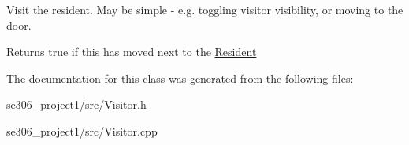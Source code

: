 Visit the resident. May be simple -\/ e.\-g. toggling visitor visibility, or moving to the door. 

\begin{DoxyReturn}{Returns}
true if this has moved next to the \hyperlink{classResident}{Resident} 
\end{DoxyReturn}


The documentation for this class was generated from the following files\-:\begin{DoxyCompactItemize}
\item 
se306\-\_\-project1/src/Visitor.\-h\item 
se306\-\_\-project1/src/Visitor.\-cpp\end{DoxyCompactItemize}
